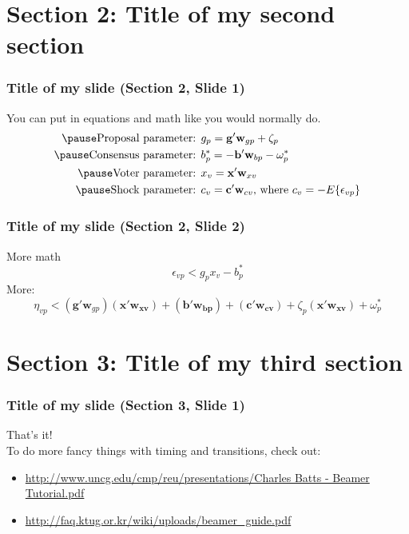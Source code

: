 \documentclass{beamer}    %
\begin{document}
\section{Section 2: Title of my second section} %
\begin{frame}
\frametitle{Title of my slide (Section 2, Slide 1)}
\pause
You can put in equations and math like you would normally do.
\begin{equation*}
\begin{aligned}
\pause
\mbox{Proposal parameter: } & g_{p} = \mathbf{g'}\mathbf{w}_{gp}+ \zeta_p \\
\pause
\mbox{Consensus parameter: } & b^*_p = -\mathbf{b'}\mathbf{w}_{bp} - \omega^*_p \\
\pause
\mbox{Voter parameter: } & x_v = \mathbf{x'}\mathbf{w}_{xv} \\
\pause
\mbox{Shock parameter: } & c_v = \mathbf{c'}\mathbf{w}_{cv} \mbox{, where } c_v = -E{\{\epsilon_{vp}\}} \\
\end{aligned}
\end{equation*}
\end{frame}

\begin{frame}
\frametitle{Title of my slide (Section 2, Slide 2)}
\pause
More math
\begin{equation*}
\epsilon_{vp} < g_p x_v - b^*_p
\end{equation*}
\pause
More:
\begin{equation*}
\eta_{vp} < (\mathbf{g'}\mathbf{w}_{gp})(\mathbf{x'}\mathbf{w_{xv}}) + (\mathbf{b'}\mathbf{w_{bp}})
  + (\mathbf{c'}\mathbf{w_{cv}}) + \zeta_p(\mathbf{x'}\mathbf{w_{xv}}) + \omega^*_p
\end{equation*}
\end{frame}

\section{Section 3: Title of my third section}
\begin{frame}
\frametitle{Title of my slide (Section 3, Slide 1)}
That's it! \\
\bigskip
To do more fancy things with timing and transitions, check out: \\
\begin{itemize}
\item \url{http://www.uncg.edu/cmp/reu/presentations/Charles Batts - Beamer Tutorial.pdf} \\
\item \url{http://faq.ktug.or.kr/wiki/uploads/beamer_guide.pdf} \\
\end{itemize}
\end{frame}
\end{document}
